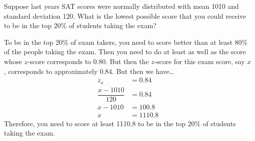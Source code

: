 \documentclass[11pt,letterpaper]{article}
\begin{document}
\newpage



 Suppose last years SAT scores were normally distributed with mean 1010 and standard deviation 120. What is the lowest possible score that you could receive to be in the top 20\% of students taking the exam? \pspace

\sol To be in the top 20\% of exam takers, you need to score better than at least 80\% of the people taking the exam. Then you need to do at least as well as the score whose $z$-score corresponds to 0.80. But then the $z$-score for this exam score, say $x$, corresponds to approximately 0.84. But then we have\dots
	\[
	\begin{aligned}
	z_x&= 0.84 \\[0.3cm]
	\dfrac{x - 1010}{120}&= 0.84 \\[0.3cm]
	x - 1010&= 100.8 \\[0.3cm]
	x&= 1110.8
	\end{aligned}
	\]
Therefore, you need to score at least 1110.8 to be in the top 20\% of students taking the exam. 
\end{document}
